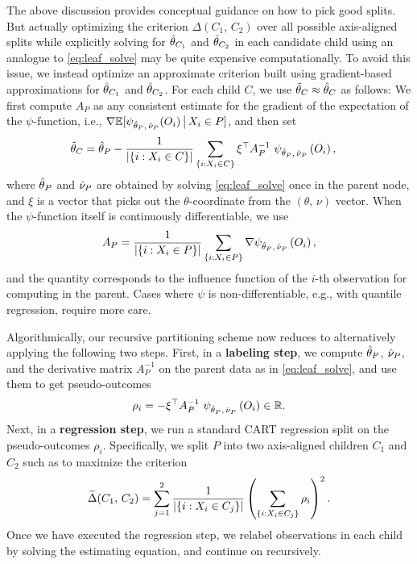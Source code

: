 \documentclass[aos]{imsart}
\theoremstyle{plain}
\theoremstyle{definition}
\theoremstyle{remark}
\begin{document}
\begin{CJK}{UTF8}{gbsn}
{The above discussion provides conceptual guidance on how to pick
good splits. But actually optimizing the
criterion $\Delta(C_1, \, C_2)$ over all possible axis-aligned splits
while explicitly solving for $\hat{\theta}_{C_1}$ and $\hat{\theta}_{C_2}$ in each candidate child
using an analogue to \eqref{eq:leaf_solve} may be quite expensive computationally.
To avoid this issue, we instead optimize an approximate criterion 
built using gradient-based approximations for $\hat{\theta}_{C_1}$ and $\hat{\theta}_{C_2}$.
For each child $C$, we use $\tilde{\theta}_C \approx \hat{\theta}_C$ as follows:
We first compute $A_P$ as any consistent estimate for the gradient of the expectation of the $\psi$-function, i.e.,
$\nabla \mathbb{E}[\psi_{\hat{\theta}_P, \, \hat{\nu}_P}(O_i) \,\big|\, X_i \in P]$, and then set
\begin{align}
\label{eq:ttheta}
&\ttheta_C = \htheta_P - \frac{1}{\abs{\cb{i : X_i \in C}}} \sum_{\cb{i : X_i \in C}} \xi^\top A^{-1}_P \ \psi_{\htheta_P, \, \hnu_P}\p{O_i},
\end{align}
where $\hat{\theta}_P$ and $\hat{\nu}_P$ are obtained by solving \eqref{eq:leaf_solve} once in the parent node,
and $\xi$ is a vector that picks out the $\theta$-coordinate from the $(\theta, \, \nu)$ vector.
When the $\psi$-function itself is continuously differentiable, we use
\begin{equation}
\label{eq:AP}
A_P= \frac{1}{\abs{\cb{i : X_i \in P}}} \sum_{\cb{i : X_i \in P}} \nabla \psi_{\htheta_P, \, \hnu_P}\p{O_i},
\end{equation}
and the quantity  corresponds
to the influence function of the $i$-th observation for computing  in the parent.
Cases where $\psi$ is non-differentiable, e.g., with quantile regression, require more care.

Algorithmically, our recursive partitioning scheme now reduces to alternatively
applying the following two steps. First, in a {\bf labeling step}, we compute
$\hat{\theta}_P$, $\hat{\nu}_P$, and the derivative matrix $A_P^{-1}$ on the parent
data as in \eqref{eq:leaf_solve}, and use them to get pseudo-outcomes
\begin{equation}
\label{eq:relabel}
\rho_i = -\xi^\top A_P^{-1} \ \psi_{\htheta_P, \, \hnu_P}\p{O_i} \in \RR.
\end{equation}
Next, in a {\bf regression step}, we run a standard CART regression split on the pseudo-outcomes
$\rho_i$. Specifically, we split $P$ into two axis-aligned children $C_1$ and $C_2$
such as to maximize the criterion
\begin{equation}
\label{eq:gradient_criterion}
\tDelta(C_1, \, C_2) =  \sum_{j = 1}^2\frac{1}{\abs{\cb{i : X_i \in C_j}}}\p{ \sum_{\cb{i : X_i \in C_j}} \rho_i}^2.
\end{equation}
Once we have executed the regression step, we relabel observations in each child by solving the
estimating equation, and continue on recursively.

}
\end{CJK}
\end{document}
